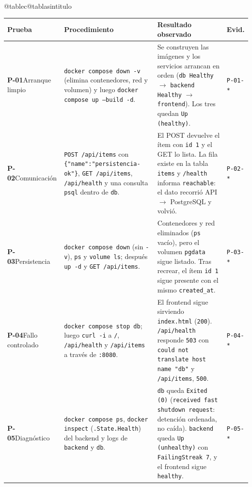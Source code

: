 \documentclass[11pt,a4paper]{article}
\makeatletter
\newcommand{\cod}[1]{\texttt{#1}}
\newcommand{\ruta}[1]{\nolinkurl{#1}}
\newcounter{tablasintitulo}
\newcommand{\sinnumerotabla}{%
  \expandafter\let\csname c@table\expandafter\endcsname\csname c@tablasintitulo\endcsname}
\makeatother
\begin{document}
{\small{}\sinnumerotabla
\begin{xltabular}{\linewidth}{@{}>{\raggedright\arraybackslash}p{2.05cm} >{\raggedright\arraybackslash}X >{\raggedright\arraybackslash}X >{\raggedright\arraybackslash}p{1.25cm}@{}}
\toprule
\bfseries Prueba & \bfseries Procedimiento & \bfseries Resultado observado & \bfseries Evid. \\
\midrule
\endhead
\textbf{\sffamily P-01}\newline Arranque limpio & \cod{docker compose down -v} (elimina contenedores, red y volumen) y luego \cod{docker compose up --build -d}. & Se construyen las imágenes y los servicios arrancan en orden (\cod{db Healthy} $\to$ \cod{backend Healthy} $\to$ \cod{frontend}). Los tres quedan \cod{Up (healthy)}. & \ruta{P-01-*} \\
\textbf{\sffamily P-02}\newline Comunicación & \cod{POST /api/items} con \cod{\{"name":"persistencia-ok"\}}, \cod{GET /api/items}, \cod{/api/health} y una consulta \cod{psql} dentro de \cod{db}. & El POST devuelve el ítem con \cod{id 1} y el GET lo lista. La fila existe en la tabla \cod{items} y \cod{/health} informa \cod{reachable}: el dato recorrió API $\to$ PostgreSQL y volvió. & \ruta{P-02-*} \\
\textbf{\sffamily P-03}\newline Persistencia & \cod{docker compose down} (sin \cod{-v}), \cod{ps} y \cod{volume ls}; después \cod{up -d} y \cod{GET /api/items}. & Contenedores y red eliminados (\cod{ps} vacío), pero el volumen \cod{pgdata} sigue listado. Tras recrear, el ítem \cod{id 1} sigue presente con el mismo \cod{created\_at}. & \ruta{P-03-*} \\
\textbf{\sffamily P-04}\newline Fallo controlado & \cod{docker compose stop db}; luego \cod{curl -i} a \cod{/}, \cod{/api/health} y \cod{/api/items} a través de \cod{:8080}. & El frontend sigue sirviendo \cod{index.html} (\cod{200}). \cod{/api/health} responde \cod{503} con \cod{could not translate host name "db"} y \cod{/api/items}, \cod{500}. & \ruta{P-04-*} \\
\textbf{\sffamily P-05}\newline Diagnóstico & \cod{docker compose ps}, \cod{docker inspect} (\cod{.State.Health}) del backend y logs de \cod{backend} y \cod{db}. & \cod{db} queda \cod{Exited (0)} (\cod{received fast shutdown request}: detención ordenada, no caída). \cod{backend} queda \cod{Up (unhealthy)} con \cod{FailingStreak 7}, y el frontend sigue \cod{healthy}. & \ruta{P-05-*} \\

\end{xltabular}}
\end{document}
